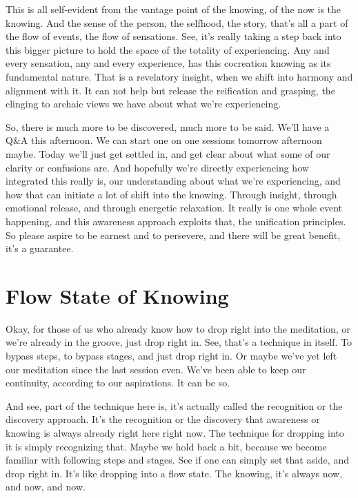 \documentclass[12pt,openany]{book}
\begin{document}
This is all self-evident from the vantage point of the knowing, of the now is the knowing. And the sense of the person, the selfhood, the story, that's all a part of the flow of events, the flow of sensations. See, it's really taking a step back into this bigger picture to hold the space of the totality of experiencing. Any and every sensation, any and every experience, has this cocreation knowing as its fundamental nature. That is a revelatory insight, when we shift into harmony and alignment with it. It can not help but release the reification and grasping, the clinging to archaic views we have about what we're experiencing. 

So, there is much more to be discovered, much more to be said. We'll have a Q\&A this afternoon. We can start one on one sessions tomorrow afternoon maybe. Today we’ll just get settled in, and get clear about what some of our clarity or confusions are. And hopefully we’re directly experiencing how integrated this really is, our understanding about what we’re experiencing, and how that can initiate a lot of shift into the knowing. Through insight, through emotional release, and through energetic relaxa\-tion. It really is one whole event happening, and this awareness approach exploits that, the unification principles. So please aspire to be earnest and to persevere, and there will be great benefit, it’s a guarantee.

\chapter*{Flow State of Knowing}

Okay, for those of us who already know how to drop right into the meditation, or we're already in the groove, just drop right in. See, that’s a technique in itself. To bypass steps, to bypass stages, and just drop right in. Or maybe we've yet left our meditation since the last session even. We’ve been able to keep our continuity, according to our aspirations. It can be so.

And see, part of the technique here is, it's actually called the recognition or the discovery approach. It's the recognition or the discovery that awareness or knowing is always already right here right now. The technique for dropping into it is simply recognizing that. Maybe we hold back a bit, because we become familiar with following steps and stages. See if one can simply set that aside, and drop right in. It's like dropping into a flow state. The knowing, it's always now, and now, and now.
\end{document}
